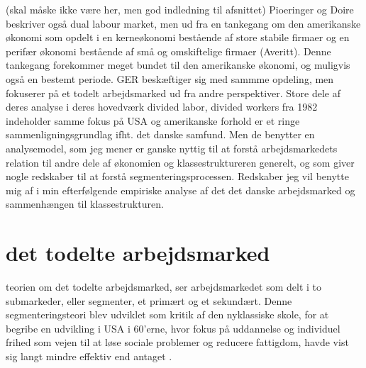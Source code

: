 (skal måske ikke være her, men god indledning til afsnittet)
Pioeringer og Doire beskriver også dual labour market, men ud fra en tankegang om den amerikanske økonomi som opdelt i en kerneøkonomi bestående af store stabile firmaer og en perifær økonomi bestående af små og omskiftelige firmaer (Averitt). Denne tankegang forekommer meget bundet til den amerikanske økonomi, og muligvis også en bestemt periode. GER beskæftiger sig med sammme opdeling, men fokuserer på et todelt arbejdsmarked ud fra andre perspektiver. Store dele af deres analyse i deres hovedværk divided labor, divided workers fra 1982 indeholder samme fokus på USA og amerikanske forhold er et ringe sammenligningsgrundlag ifht. det danske samfund. Men de benytter en analysemodel, som jeg mener er ganske nyttig til at forstå arbejdsmarkedets relation til andre dele af økonomien og klassestruktureren generelt, og som giver nogle redskaber til at forstå segmenteringsprocessen. Redskaber jeg vil benytte mig af i min efterfølgende empiriske analyse af det det danske arbejdsmarked og sammenhængen til klassestrukturen. 



\section{det todelte arbejdsmarked \label{GER}} 

teorien om det todelte arbejdsmarked, ser arbejdsmarkedet som delt i to submarkeder, eller segmenter, et primært og et sekundært. Denne segmenteringsteori blev udviklet som kritik af den nyklassiske skole, for at begribe en udvikling i USA i 60'erne, hvor fokus på uddannelse og individuel frihed som vejen til at løse sociale problemer og reducere fattigdom, havde vist sig langt mindre effektiv end antaget \parencites[63]{Leontaridi1998}[1231]{Cain1976}. 



